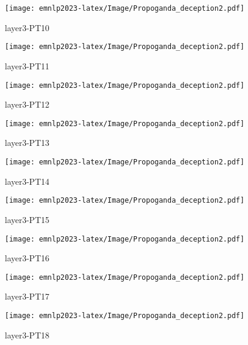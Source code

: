 \begin{figure*}[htbp]
    \begin{subfigure}[b]{0.33\textwidth}
    \centering
        \texttt{[image: emnlp2023-latex/Image/Propoganda\_deception2.pdf]}
        \caption{layer3-PT10}
    \end{subfigure}
    \begin{subfigure}[b]{0.33\textwidth}
    \centering
        \texttt{[image: emnlp2023-latex/Image/Propoganda\_deception2.pdf]}
        \caption{layer3-PT11}
    \end{subfigure}    
    \begin{subfigure}[b]{0.33\textwidth}
    \centering
        \texttt{[image: emnlp2023-latex/Image/Propoganda\_deception2.pdf]}
        \caption{layer3-PT12}
    \end{subfigure}
    \begin{subfigure}[b]{0.33\textwidth}
    \centering
        \texttt{[image: emnlp2023-latex/Image/Propoganda\_deception2.pdf]}
        \caption{layer3-PT13}
    \end{subfigure}
    \begin{subfigure}[b]{0.33\textwidth}
    \centering
        \texttt{[image: emnlp2023-latex/Image/Propoganda\_deception2.pdf]}
        \caption{layer3-PT14}
    \end{subfigure}
    \begin{subfigure}[b]{0.33\textwidth}
    \centering
        \texttt{[image: emnlp2023-latex/Image/Propoganda\_deception2.pdf]}
        \caption{layer3-PT15}
    \end{subfigure}
    \begin{subfigure}[b]{0.33\textwidth}
    \centering
        \texttt{[image: emnlp2023-latex/Image/Propoganda\_deception2.pdf]}
        \caption{layer3-PT16}
    \end{subfigure}
    \begin{subfigure}[b]{0.33\textwidth}
    \centering
        \texttt{[image: emnlp2023-latex/Image/Propoganda\_deception2.pdf]}
        \caption{layer3-PT17}
    \end{subfigure}
    \begin{subfigure}[b]{0.33\textwidth}
    \centering
        \texttt{[image: emnlp2023-latex/Image/Propoganda\_deception2.pdf]}
        \caption{layer3-PT18}
    \end{subfigure}
\end{figure*}